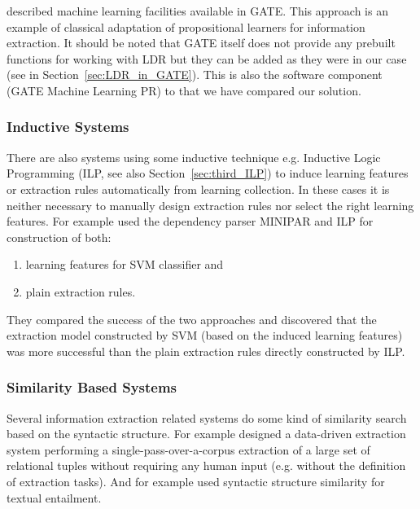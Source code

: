 \citep{Yaoyong09a} described machine learning facilities available in GATE. This approach is an example of classical adaptation of propositional learners for information extraction. It should be noted that GATE itself does not provide any prebuilt functions for working with LDR but they can be added as they were in our case (see in Section~\ref{sec:LDR_in_GATE}). This is also the software component (GATE Machine Learning PR) to that we have compared our solution. 


\subsubsection{Inductive Systems}

There are also systems using some inductive technique e.g. Inductive Logic Programming (ILP, see also Section~\ref{sec:third_ILP}) to induce learning features or extraction rules automatically from learning collection. In these cases it is neither necessary to manually design extraction rules nor select the right learning features. For example \cite{DBLP:conf/ilp/RamakrishnanJBS07} used the dependency parser MINIPAR \citep{minipar} and ILP for construction of both:
\begin{enumerate}
	\item learning features for SVM classifier and
	\item plain extraction rules.
\end{enumerate}
They compared the success of the two approaches and discovered that the extraction model constructed by SVM (based on the induced learning features) was more successful than the plain extraction rules directly constructed by ILP.


\subsubsection{Similarity Based Systems}

Several information extraction related systems do some kind of similarity search based on the syntactic structure. For example
\cite{Etzioni08informationExtraction} designed a data-driven extraction system performing a single-pass-over-a-corpus extraction of a large
set of relational tuples without requiring any human input (e.g. without the definition of extraction tasks).  And for example 
\cite{Wang:SimilarityTreeSkeletons} used syntactic structure similarity for textual entailment.

